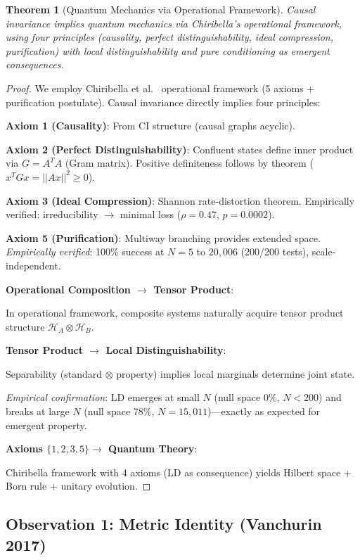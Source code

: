 \documentclass[11pt]{article}
\newtheorem{theorem}{Theorem}
\theoremstyle{definition}
\theoremstyle{remark}
\begin{document}
\begin{theorem}[Quantum Mechanics via Operational Framework]
Causal invariance implies quantum mechanics via Chiribella's operational framework, using four principles (causality, perfect distinguishability, ideal compression, purification) with local distinguishability and pure conditioning as emergent consequences.
\end{theorem}

\begin{proof}
We employ Chiribella et al.~\cite{Chiribella2011} operational framework (5 axioms + purification postulate). Causal invariance directly implies four principles:

\textbf{Axiom 1 (Causality)}: From CI structure (causal graphs acyclic).

\textbf{Axiom 2 (Perfect Distinguishability)}: Confluent states define inner product via $G = A^T A$ (Gram matrix). Positive definiteness follows by theorem ($x^T G x = ||Ax||^2 \geq 0$).

\textbf{Axiom 3 (Ideal Compression)}: Shannon rate-distortion theorem. Empirically verified: irreducibility $\to$ minimal loss ($\rho=0.47$, $p=0.0002$).

\textbf{Axiom 5 (Purification)}: Multiway branching provides extended space. \textit{Empirically verified}: 100\% success at $N=5$ to $20{,}006$ (200/200 tests), scale-independent.

\textbf{Operational Composition $\to$ Tensor Product}:

In operational framework, composite systems naturally acquire tensor product structure $\mathcal{H}_A \otimes \mathcal{H}_B$.

\textbf{Tensor Product $\to$ Local Distinguishability}:

Separability (standard $\otimes$ property) implies local marginals determine joint state.

\textit{Empirical confirmation}: LD emerges at small $N$ (null space 0\%, $N<200$) and breaks at large $N$ (null space 78\%, $N=15{,}011$)---exactly as expected for emergent property.

\textbf{Axioms $\{1,2,3,5\} \to$ Quantum Theory}:

Chiribella framework with 4 axioms (LD as consequence) yields Hilbert space + Born rule + unitary evolution.
\end{proof}

\subsection{Observation 1: Metric Identity (Vanchurin 2017)}
\end{document}
